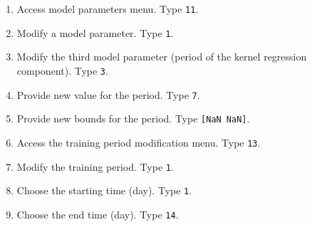 \begin{enumerate}
\item Access model parameters menu. Type \colorbox{light-gray}{\lstinline[basicstyle = \mlttfamily \small, backgroundcolor = \color{light-gray}]!11!}.
\item Modify a model parameter. Type \colorbox{light-gray}{\lstinline[basicstyle = \mlttfamily \small, backgroundcolor = \color{light-gray}]!1!}.
\item Modify the third model parameter (period of the kernel regression component). Type \colorbox{light-gray}{\lstinline[basicstyle = \mlttfamily \small, backgroundcolor = \color{light-gray}]!3!}.
\item Provide new value for  the period. Type \colorbox{light-gray}{\lstinline[basicstyle = \mlttfamily \small, backgroundcolor = \color{light-gray}]!7!}.
\item Provide new bounds for the period. Type \colorbox{light-gray}{\lstinline[basicstyle = \mlttfamily \small, backgroundcolor = \color{light-gray}]![NaN NaN]!}.

\item Access the training period modification menu. Type \colorbox{light-gray}{\lstinline[basicstyle = \mlttfamily \small, backgroundcolor = \color{light-gray}]!13!}. 

\item Modify the training period. Type \colorbox{light-gray}{\lstinline[basicstyle = \mlttfamily \small, backgroundcolor = \color{light-gray}]!1!}. 

\item Choose the starting time (day). Type \colorbox{light-gray}{\lstinline[basicstyle = \mlttfamily \small, backgroundcolor = \color{light-gray}]!1!}. 

\item Choose the end time (day). Type \colorbox{light-gray}{\lstinline[basicstyle = \mlttfamily \small, backgroundcolor = \color{light-gray}]!14!}. 


\end{enumerate}
